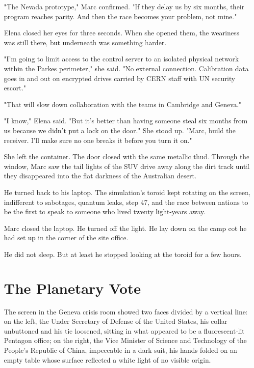 \documentclass[11pt,a5paper,twoside]{book}
\begin{document}
"The Nevada prototype," Marc confirmed. "If they delay us by six months, their program reaches parity. And then the race becomes your problem, not mine."

Elena closed her eyes for three seconds. When she opened them, the weariness was still there, but underneath was something harder.

"I'm going to limit access to the control server to an isolated physical network within the Parkes perimeter," she said. "No external connection. Calibration data goes in and out on encrypted drives carried by CERN staff with UN security escort."

"That will slow down collaboration with the teams in Cambridge and Geneva."

"I know," Elena said. "But it's better than having someone steal six months from us because we didn't put a lock on the door." She stood up. "Marc, build the receiver. I'll make sure no one breaks it before you turn it on."

She left the container. The door closed with the same metallic thud. Through the window, Marc saw the tail lights of the SUV drive away along the dirt track until they disappeared into the flat darkness of the Australian desert.

He turned back to his laptop. The simulation's toroid kept rotating on the screen, indifferent to sabotages, quantum leaks, step 47, and the race between nations to be the first to speak to someone who lived twenty light-years away.

Marc closed the laptop. He turned off the light. He lay down on the camp cot he had set up in the corner of the site office.

He did not sleep. But at least he stopped looking at the toroid for a few hours.

\chapter{The Planetary Vote}

The screen in the Geneva crisis room showed two faces divided by a vertical line: on the left, the Under Secretary of Defense of the United States, his collar unbuttoned and his tie loosened, sitting in what appeared to be a fluorescent-lit Pentagon office; on the right, the Vice Minister of Science and Technology of the People's Republic of China, impeccable in a dark suit, his hands folded on an empty table whose surface reflected a white light of no visible origin.
\end{document}
